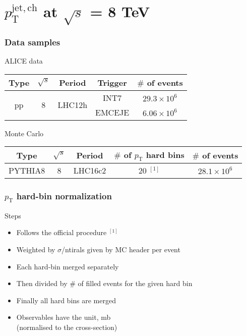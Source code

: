 

\section{$p_\mathrm{T}^\mathrm{jet,ch}$ at $\sqrt{s}$ = 8 TeV}

\begin{frame}
\frametitle{Data samples}
ALICE data
\begin{table}[htp]
\begin{center}
\begin{tabular}{|c|c|c|c|c|}
\hline
Type & $\sqrt{s}$ & Period & Trigger & $\#$ of events\\
\hline
\multirow{ 2}{*}{pp} & \multirow{ 2}{*}{8} & \multirow{ 2}{*}{LHC12h} & INT7 & $29.3\times10^6$ \\
                    &                    &													& EMCEJE & $6.06\times10^6$ \\

\hline
\end{tabular}
\end{center}
\label{default}
\end{table}%

Monte Carlo
\begin{table}[htp]
\begin{center}
\begin{tabular}{|c|c|c|c|c|}
\hline
Type & $\sqrt{s}$ & Period & $\#$ of $p_\mathrm{T}$ hard bins & $\#$ of events\\
\hline
PYTHIA8 & 8 & LHC16c2 & 20 $^{[1]}$ & $28.1\times10^6$ \\
\hline
\end{tabular}
\end{center}
\label{default}
\end{table}%

\end{frame}


\begin{frame}
\frametitle{$p_\mathrm{T}$ hard-bin normalization}
Steps
\begin{itemize}
\item{Follows the official procedure $^{[1]}$}
\item{Weighted by $\sigma$/ntirals given by MC header per event}
\item{Each hard-bin merged separately}
\item{Then divided by $\#$ of filled events for the given hard bin}
\item{Finally all hard bins are merged}
\item{Observables have the unit, mb \\(normalised to the cross-section)}
\end{itemize}
\scriptsize
{}
\end{frame}

